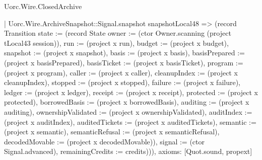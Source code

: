 \begin{lexlean}{Uorc.Wire.ClosedArchive}
\begin{semanticmodule}
{    | Uorc.Wire.ArchiveSnapshot::Signal.snapshot snapshotLocal48 => (record Transition {state := (record State {owner := (ctor Owner.scanning (project tLocal43 session)), run := (project x run), budget := (project x budget), snapshot := (project x snapshot), basis := (project x basis), basisPrepared := (project x basisPrepared), basisTicket := (project x basisTicket), program := (project x program), caller := (project x caller), cleanupIndex := (project x cleanupIndex), stopped := (project x stopped), failure := (project x failure), ledger := (project x ledger), receipt := (project x receipt), protected := (project x protected), borrowedBasis := (project x borrowedBasis), auditing := (project x auditing), ownershipValidated := (project x ownershipValidated), auditIndex := (project x auditIndex), auditedTickets := (project x auditedTickets), semantic := (project x semantic), semanticRefusal := (project x semanticRefusal), decodedMovable := (project x decodedMovable)}), signal := (ctor Signal.advanced), remainingCredits := credits}))),
  axioms: [Quot.sound, propext]
}


\end{semanticmodule}
\end{lexlean}
